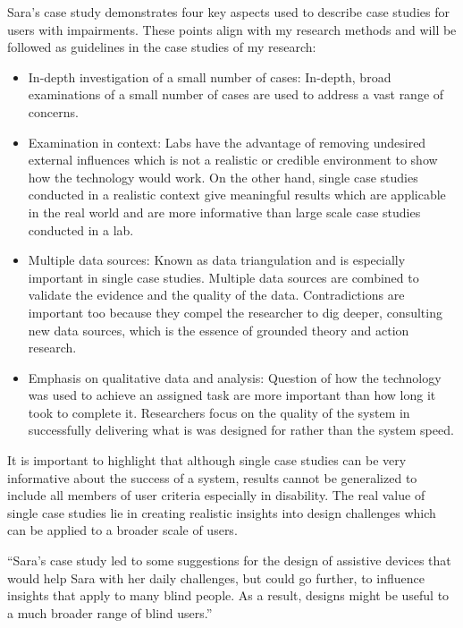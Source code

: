 Sara’s case study demonstrates four key aspects used to describe case studies for users with impairments.  These points align with my research methods and will be followed as guidelines in the case studies of my research:

\begin{itemize}
    \item In-depth investigation of a small number of cases: In-depth, broad examinations of a small number of cases are used to address a vast range of concerns.
    
    \item Examination in context: Labs have the advantage of removing undesired external influences which is not a realistic or credible environment to show how the technology would work. On the other hand, single case studies conducted in a realistic context give meaningful results which are applicable in the real world and are more informative than large scale case studies conducted in a lab.
    
    \item Multiple data sources: Known as data triangulation and is especially important in single case studies. Multiple data sources are combined to validate the evidence and the quality of the data. Contradictions are important too because they compel the researcher to dig deeper, consulting new data sources, which is the essence of grounded theory and action research.
    
    \item Emphasis on qualitative data and analysis: Question of how the technology was used to achieve an assigned task are more important than how long it took to complete it. Researchers focus on the quality of the system in successfully delivering what is was designed for rather than the system speed. 
\end{itemize}

It is important to highlight that although single case studies can be very informative about the success of a system, results cannot be generalized to include all members of user criteria especially in disability. The real value of single case studies lie in creating realistic insights into design challenges which can be applied to a broader scale of users.

``Sara’s case study led to some suggestions for the design of assistive devices that would help Sara with her daily challenges, but could go further, to influence insights that apply to many blind people.  As a result, designs might be useful to a much broader range of blind users.'' \parencite{Shinohara2009}

